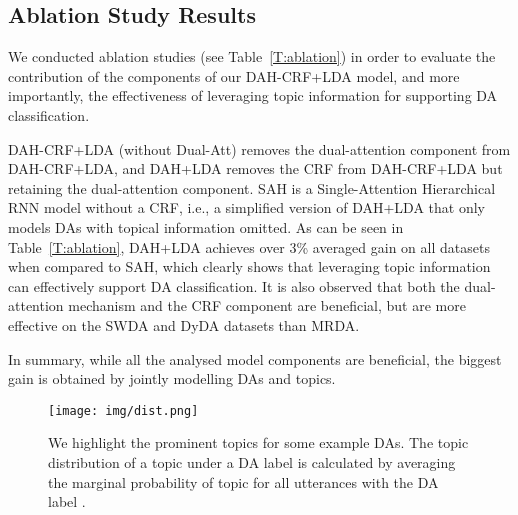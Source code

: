 \documentclass[11pt,a4paper]{article}
\begin{document}
\begin{table}[tb] 
  \caption{Ablation studies of DA classification.}
  \label{T:ablation}
\end{table}

\subsection{Ablation Study Results}
We conducted ablation studies (see Table~\ref{T:ablation}) in order to evaluate the contribution of the components of our DAH-CRF+LDA model, and more importantly, the effectiveness of leveraging topic information for supporting DA classification.

DAH-CRF+LDA (without Dual-Att) removes the dual-attention component from DAH-CRF+LDA, and   DAH+LDA removes the CRF from DAH-CRF+LDA but retaining the dual-attention component. SAH is a Single-Attention Hierarchical RNN model without a CRF, i.e., a simplified version of DAH+LDA that only models DAs with topical information omitted. As can be seen in Table~\ref{T:ablation},  DAH+LDA achieves over 3\% averaged gain on all datasets when compared to SAH, which clearly shows that leveraging topic information can effectively support DA classification. It is also observed that both the dual-attention mechanism and the CRF component are beneficial, but are more effective on the SWDA and DyDA datasets than MRDA.

In summary, while all the analysed model components are beneficial, the biggest   gain is obtained by jointly modelling DAs and topics. 
 

\begin{figure}[tb]
  \centering
  \texttt{[image: img/dist.png]}
  \caption{We highlight the prominent topics for some example DAs. The topic distribution of a topic  under a DA label  is calculated by averaging the marginal probability of topic  for all utterances with the DA label .}
  \label{fig:swda_dyda_topic_dist}
\end{figure}
\end{document}
